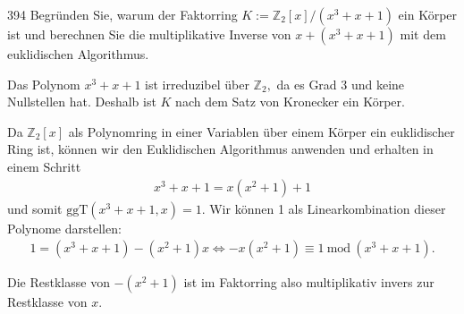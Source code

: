 \begin{algebraUE}{394}
  Begründen Sie, warum der Faktorring $K := \mathbb{Z}_2[x]/(x^3 + x + 1)$ ein Körper ist und
   berechnen Sie die multiplikative Inverse von $x + (x^3 + x + 1)$ mit dem euklidischen Algorithmus.

\end{algebraUE}

\begin{solution}
  Das Polynom $x^3 + x + 1$ ist irreduzibel über $\mathbb{Z}_2,$ da es Grad 3 und keine Nullstellen hat. Deshalb ist $K$ nach dem Satz von Kronecker ein Körper.

  Da $\mathbb{Z}_2[x]$ als Polynomring in einer Variablen über einem Körper ein euklidischer Ring ist, können wir den Euklidischen Algorithmus anwenden und erhalten in einem Schritt
  \begin{align}
x^3 + x + 1 = x(x^2 + 1) + 1
\end{align}
und somit $\mathrm{ggT}(x^3 + x + 1, x) = 1.$ Wir können 1 als Linearkombination dieser Polynome darstellen:
\begin{align}
    1 = (x^3 + x + 1) - (x^2 + 1)x \Longleftrightarrow -x(x^2 + 1) \equiv 1 \mathrm{~mod~} (x^3 + x + 1).
\end{align}

Die Restklasse von $-(x^2+1)$ ist im Faktorring also multiplikativ invers zur Restklasse von $x$.
\end{solution}
